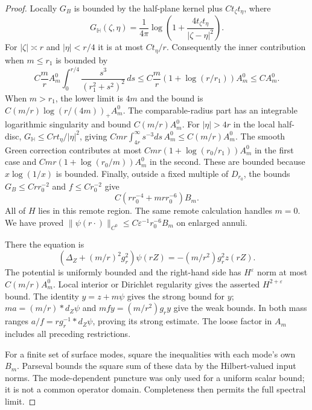 \documentclass[11pt]{amsart}
\theoremstyle{definition}
\theoremstyle{remark}
\theoremstyle{plain}
\begin{document}
\begin{proof}
Locally $G_B$ is bounded by the half-plane kernel plus
$Ct_\zeta t_\eta$, where
\[
 G_{\mathbb H}(\zeta,\eta)=\frac1{4\pi}
          \log\left(1+\frac{4t_\zeta t_\eta}{|\zeta-\eta|^2}\right).
\]
For $|\zeta|\asymp r$ and $|\eta|<r/4$ it is at most
$Ct_\eta/r$. Consequently the inner contribution when $m\leq r_1$
is bounded by
\[
 C\frac mr A_m^0\int_0^{r/4}\frac{s^3}{(r_1^2+s^2)^2}\,ds
 \leq C\frac mr(1+\log(r/r_1))A_m^0\leq CA_m^0.
\]
When $m>r_1$, the lower limit is $4m$ and the bound is
$C(m/r)\log(r/(4m))_+A_m^0$. The comparable-radius part has
an integrable logarithmic singularity and bound $C(m/r)A_m^0$.
For $|\eta|>4r$ in the local half-disc,
$G_{\mathbb H}\leq Crt_\eta/|\eta|^2$, giving
$Cmr\int_{4r}^\infty s^{-3}ds\,A_m^0\leq C(m/r)A_m^0$.
The smooth Green correction contributes at most
$Cmr(1+\log(r_0/r_1))A_m^0$ in the first case and
$Cmr(1+\log(r_0/m))A_m^0$ in the second. These are bounded
because $x\log(1/x)$ is bounded. Finally, outside a fixed
multiple of $D_{r_0}$, the bounds $G_B\leq Crr_0^{-2}$ and
$f\leq Cr_0^{-2}$ give
\[
                      C(rr_0^{-4}+mrr_0^{-6})B_m.
\]
All of $H$ lies in this remote region. The same remote calculation
handles $m=0$. We have proved
$\|\psi(r\cdot)\|_{C^0}\leq C\varepsilon^{-1}r_0^{-6}B_m$
on enlarged annuli.

There the equation is
\[
 (\Delta_Z+(m/r)^2g_r^2)\psi(rZ)=-(m/r^2)g_r^2z(rZ).
\]
The potential is uniformly bounded and the right-hand side has
$H^\varepsilon$ norm at most $C(m/r)A_m^0$. Local interior
or Dirichlet regularity gives the asserted $H^{2+\varepsilon}$
bound. The identity $y=z+m\psi$ gives the strong bound for $y$;
$ma=(m/r)*d_Z\psi$ and $mfy=(m/r^2)g_ry$ give the weak bounds.
In both mass ranges $a/f=r g_r^{-1}*d_Z\psi$, proving its
strong estimate. The loose factor in $A_m$ includes all preceding
restrictions.

For a finite set of surface modes, square the inequalities with each
mode's own $B_m$. Parseval bounds the square sum of these data by
the Hilbert-valued input norms. The mode-dependent puncture was only
used for a uniform scalar bound; it is not a common operator domain.
Completeness then permits the full spectral limit.
\end{proof}
\end{document}
